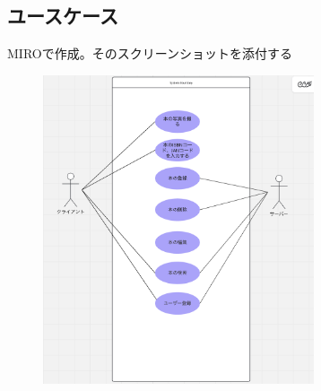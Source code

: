 \documentclass[a4paper, 11pt, titlepage]{jsarticle}
\begin{document}
\subsection{ユースケース}
MIROで作成。そのスクリーンショットを添付する
\begin{figure}[htbp]
\centering
\includegraphics[width=80mm]{usecase.png}
\label{fig:func}
\end{figure}
\end{document}
